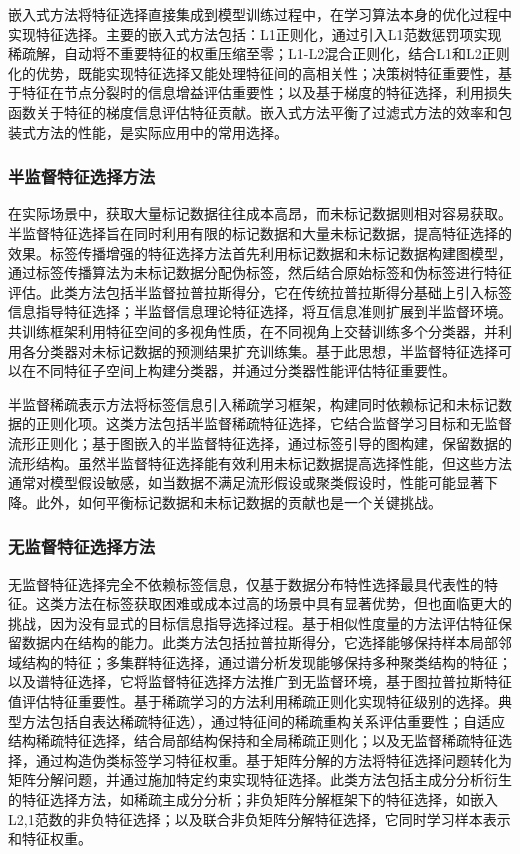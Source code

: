 \documentclass[12pt,a4paper,UTF8]{article}
\begin{document}
  嵌入式方法将特征选择直接集成到模型训练过程中，在学习算法本身的优化过程中实现特征选择。主要的嵌入式方法包括：L1正则化，通过引入L1范数惩罚项实现稀疏解，自动将不重要特征的权重压缩至零；L1-L2混合正则化，结合L1和L2正则化的优势，既能实现特征选择又能处理特征间的高相关性；决策树特征重要性，基于特征在节点分裂时的信息增益评估重要性；以及基于梯度的特征选择，利用损失函数关于特征的梯度信息评估特征贡献。嵌入式方法平衡了过滤式方法的效率和包装式方法的性能，是实际应用中的常用选择。
  
  \subsubsection{半监督特征选择方法}
  在实际场景中，获取大量标记数据往往成本高昂，而未标记数据则相对容易获取。半监督特征选择旨在同时利用有限的标记数据和大量未标记数据，提高特征选择的效果。标签传播增强的特征选择方法首先利用标记数据和未标记数据构建图模型，通过标签传播算法为未标记数据分配伪标签，然后结合原始标签和伪标签进行特征评估。此类方法包括半监督拉普拉斯得分，它在传统拉普拉斯得分基础上引入标签信息指导特征选择；半监督信息理论特征选择，将互信息准则扩展到半监督环境。共训练框架利用特征空间的多视角性质，在不同视角上交替训练多个分类器，并利用各分类器对未标记数据的预测结果扩充训练集。基于此思想，半监督特征选择可以在不同特征子空间上构建分类器，并通过分类器性能评估特征重要性。
  
 半监督稀疏表示方法将标签信息引入稀疏学习框架，构建同时依赖标记和未标记数据的正则化项。这类方法包括半监督稀疏特征选择，它结合监督学习目标和无监督流形正则化；基于图嵌入的半监督特征选择，通过标签引导的图构建，保留数据的流形结构。虽然半监督特征选择能有效利用未标记数据提高选择性能，但这些方法通常对模型假设敏感，如当数据不满足流形假设或聚类假设时，性能可能显著下降。此外，如何平衡标记数据和未标记数据的贡献也是一个关键挑战。
  \subsubsection{无监督特征选择方法}
  无监督特征选择完全不依赖标签信息，仅基于数据分布特性选择最具代表性的特征。这类方法在标签获取困难或成本过高的场景中具有显著优势，但也面临更大的挑战，因为没有显式的目标信息指导选择过程。基于相似性度量的方法评估特征保留数据内在结构的能力。此类方法包括拉普拉斯得分，它选择能够保持样本局部邻域结构的特征；多集群特征选择，通过谱分析发现能够保持多种聚类结构的特征；以及谱特征选择，它将监督特征选择方法推广到无监督环境，基于图拉普拉斯特征值评估特征重要性。基于稀疏学习的方法利用稀疏正则化实现特征级别的选择。典型方法包括自表达稀疏特征选），通过特征间的稀疏重构关系评估重要性；自适应结构稀疏特征选择，结合局部结构保持和全局稀疏正则化；以及无监督稀疏特征选择，通过构造伪类标签学习特征权重。基于矩阵分解的方法将特征选择问题转化为矩阵分解问题，并通过施加特定约束实现特征选择。此类方法包括主成分分析衍生的特征选择方法，如稀疏主成分分析；非负矩阵分解框架下的特征选择，如嵌入L2,1范数的非负特征选择；以及联合非负矩阵分解特征选择，它同时学习样本表示和特征权重。
  
\end{document}
